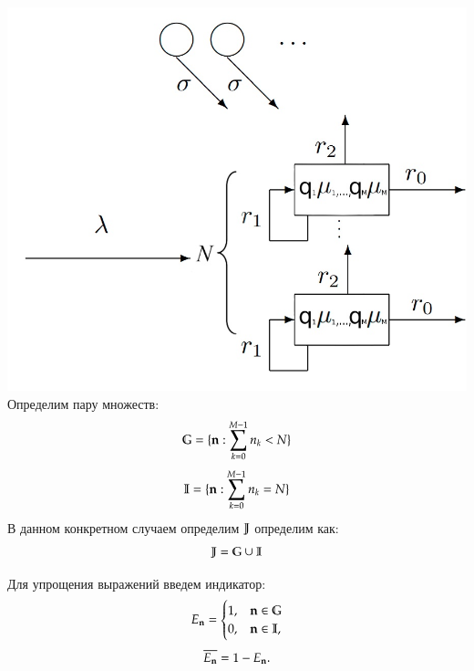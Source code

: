 \includegraphics[scale=0.4]{NExecutionMPhase}
\\
Определим пару множеств:
\[\mathbb{G} = \{\bold{n} : \sum_{k=0}^{M-1}n_k < N\}\]
\[\mathbb{I} = \{\bold{n} : \sum_{k=0}^{M-1}n_k = N\}\]
В данном конкретном случаем определим \(\mathbb{J}\) определим как:
\[\mathbb{J} = \mathbb{G} \cup \mathbb{I}\]

Для упрощения выражений введем индикатор:
\begin{equation*}
    E_{\bold{n}} =
    \begin{cases}
        1, &{\bold{n} \in \mathbb{G} }\\
        0, &{\bold{n} \in \mathbb{I} },
    \end{cases}
\end{equation*}
\begin{equation*}
    \overline{E_{\bold{n}}} = 1 - E_{\bold{n}}.
\end{equation*}


